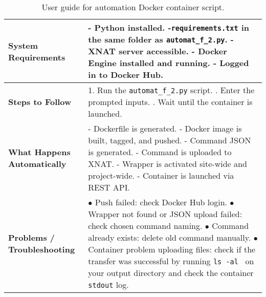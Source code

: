 \begin{table}[H]
  \centering
  \caption{ User guide for automation Docker container script.}
  \label{tab:automatic_script}
  \begin{tabular}{|l|p{9cm}|}
  \hline
  \textbf{System Requirements} & 
  - Python installed. \newline
  -\texttt{requirements.txt} in the same folder as \texttt{automat\_f\_2.py}. \newline
  - XNAT server accessible. \newline
  - Docker Engine installed and running. \newline
  - Logged in to Docker Hub. \\  \hline
  \textbf{Steps to Follow} & 
  1. Run the \texttt{automat\_f\_2.py} script. \newline
  2. Enter the prompted inputs. \newline
  3. Wait until the container is launched. \\
  \hline
  \textbf{What Happens Automatically} & 
  - Dockerfile is generated. \newline
  - Docker image is built, tagged, and pushed. \newline
  - Command JSON is generated. \newline
  - Command is uploaded to XNAT. \newline
  - Wrapper is activated site-wide and project-wide. \newline
  - Container is launched via REST API. \\
  \hline
  \textbf{Problems / Troubleshooting} & 
  $\bullet$ Push failed: check Docker Hub login. \newline
  $\bullet$ Wrapper not found or JSON upload failed: check chosen command naming. \newline
  $\bullet$ Command already exists: delete old command manually. \newline
  $\bullet$ Container problem uploading files: check if the transfer was successful by running \texttt{ls -al \*} on your output directory and check the container \texttt{stdout} log. \\
  \hline
  \end{tabular}
\end{table}


\normalsize
